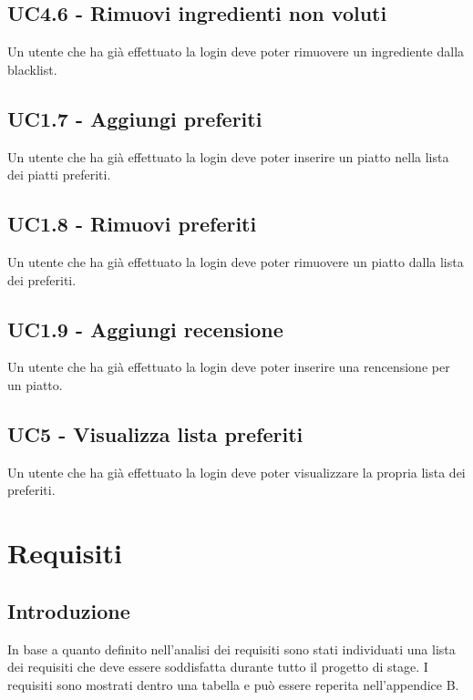 \subsection{UC4.6 - Rimuovi ingredienti non voluti}
Un utente che ha già effettuato la login deve poter rimuovere un ingrediente dalla blacklist.
\subsection{UC1.7 - Aggiungi preferiti}
Un utente che ha già effettuato la login deve poter inserire un piatto nella lista dei piatti preferiti.
\subsection{UC1.8 - Rimuovi preferiti}
Un utente che ha già effettuato la login deve poter rimuovere un piatto dalla lista dei preferiti.
\subsection{UC1.9 - Aggiungi recensione}
Un utente che ha già effettuato la login deve poter inserire una rencensione per un piatto.
\subsection{UC5 - Visualizza lista preferiti}
Un utente che ha già effettuato la login deve poter visualizzare la propria lista dei preferiti.
\section{Requisiti}
\subsection{Introduzione}
In base a quanto definito nell'analisi dei requisiti sono stati individuati una lista dei requisiti che deve essere soddisfatta durante tutto il progetto di stage. I requisiti sono mostrati dentro una tabella e può essere reperita nell'appendice B.